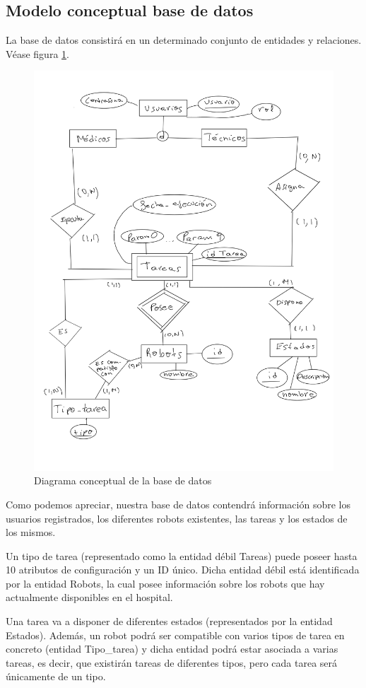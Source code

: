 \subsection{Modelo conceptual base de datos}
La base de datos consistirá en un determinado conjunto de entidades y relaciones. Véase figura \ref{fig:database}.

\begin{figure}[H]
	\centering
	\includegraphics[width=1\textwidth]{images/ModeloConceptual.png}
	\caption{Diagrama conceptual de la base de datos}
	\label{fig:database}
\end{figure}

Como podemos apreciar, nuestra base de datos contendrá información sobre los usuarios registrados, los diferentes robots existentes, las tareas y los estados de los mismos.

Un tipo de tarea (representado como la entidad débil Tareas) puede poseer hasta 10 atributos de configuración y un ID único. Dicha entidad débil está identificada por la entidad Robots, la cual posee información sobre los robots que hay actualmente disponibles en el hospital.

Una tarea va a disponer de diferentes estados (representados por la entidad Estados). Además, un robot podrá ser compatible con varios tipos de tarea en concreto (entidad Tipo\_tarea) y dicha entidad podrá estar asociada a varias tareas, es decir, que existirán tareas de diferentes tipos, pero cada tarea será únicamente de un tipo.
\newpage